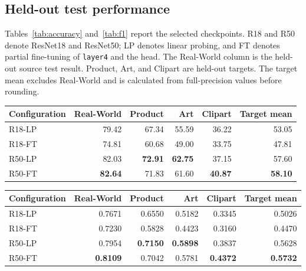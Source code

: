 \documentclass[10pt,a4paper]{article}
\begin{document}
\subsection{Held-out test performance}
Tables~\ref{tab:accuracy} and~\ref{tab:f1} report the selected checkpoints. R18 and R50 denote ResNet18 and ResNet50; LP denotes linear probing, and FT denotes partial fine-tuning of \texttt{layer4} and the head. The Real-World column is the held-out source test result. Product, Art, and Clipart are held-out targets. The target mean excludes Real-World and is calculated from full-precision values before rounding.

\begin{center}\begin{minipage}{\linewidth}\centering
{}\label{tab:accuracy}
\begin{tabular}{lrrrrr}
\toprule
Configuration & Real-World & Product & Art & Clipart & Target mean\\
\midrule
R18-LP &79.42&67.34&55.59&36.22&53.05\\
R18-FT &74.81&60.68&49.00&33.75&47.81\\
R50-LP &82.03&\textbf{72.91}&\textbf{62.75}&37.15&57.60\\
R50-FT &\textbf{82.64}&71.83&61.60&\textbf{40.87}&\textbf{58.10}\\
\bottomrule
\end{tabular}
\end{minipage}\end{center}

\begin{center}\begin{minipage}{\linewidth}\centering
{}\label{tab:f1}
\begin{tabular}{lrrrrr}
\toprule
Configuration & Real-World & Product & Art & Clipart & Target mean\\
\midrule
R18-LP &0.7671&0.6550&0.5182&0.3345&0.5026\\
R18-FT &0.7230&0.5828&0.4423&0.3160&0.4470\\
R50-LP &0.7954&\textbf{0.7150}&\textbf{0.5898}&0.3837&0.5628\\
R50-FT &\textbf{0.8109}&0.7042&0.5781&\textbf{0.4372}&\textbf{0.5732}\\
\bottomrule
\end{tabular}
\end{minipage}\end{center}
\end{document}
